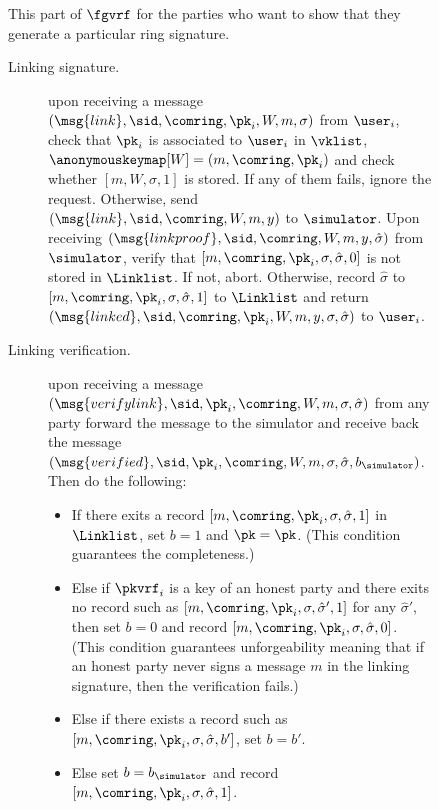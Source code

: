 \begin{figure}\scriptsize
	\begin{tcolorbox}
		{  This part of $ \fgvrf $ for the parties who want to show that they generate a particular ring signature.
			
		
			\begin{description}
				\item[Linking signature.] upon receiving a message $(\msg{link}, \sid, \comring, \pk_i, W, m,\sigma)$ from $\user_i$, check that $\pk_i $ is associated to $\user_i$ in $ \vklist $, $ \anonymouskeymap[W] = (m, \comring, \pk_i) $ and 
				check whether $ [m, W, \sigma, 1] $ is stored. If any of them fails, ignore the request. Otherwise,
				send $(\msg{link}, \sid, \comring, W, m, y)$ to $\simulator$. Upon receiving $(\msg{linkproof}, \sid, \comring, W, m, y, \hat \sigma)$ from $\simulator$, verify that $ [m, \comring, \pk_i, \sigma, \hat{\sigma}, 0] $ is not stored in $ \Linklist $. If not, abort. Otherwise,  record $\hat\sigma$ to $[m, \comring, \pk_i,\sigma, \hat{\sigma}, 1]$ to $ \Linklist $ and return $(\msg{linked}, \sid, \comring, \pk_i,W, m, y,\sigma, \hat\sigma)$ to $\user_i$.
				\item[Linking verification.] upon receiving a message $(\msg{verifylink}, \sid, \pk_i, \comring, W, m,\sigma,\hat\sigma)$ from any party forward the message to the simulator and receive back  the message $(\msg{verified}, \sid, \pk_i, \comring, W,m, \sigma,\hat\sigma,  b_{\simulator})$. Then do the following:
				
				\begin{itemize}
					\item If there exits a record $ [m, \comring,\pk_i,\sigma,\hat\sigma, 1] $ in $ \Linklist $, set $ b = 1 $ and $ \pk = \pk $. (This condition guarantees the completeness.)
					\item Else if $ \pkvrf_i $ is a key of an honest party and there exits no record such as $ [m, \comring,\pk_i,\sigma,\hat\sigma',  1] $ for any  $  \hat\sigma'$, then set $ b = 0 $ and record $ [m, \comring,\pk_i,\sigma,\hat\sigma,  0] $. (This condition guarantees unforgeability meaning that if an honest party never signs a message $ m $ in the linking signature, then the verification fails.)
					\item Else if there exists a record  such as $ [m, \comring,\pk_i,\sigma,\hat\sigma,  b'] $, set $ b = b' $. 
					\item Else set $ b = b_{\simulator} $ and record $ [m, \comring,\pk_i,\sigma,\hat\sigma,  1] $. 
				\end{itemize}
				

\end{description}}
\end{tcolorbox}
\end{figure}
